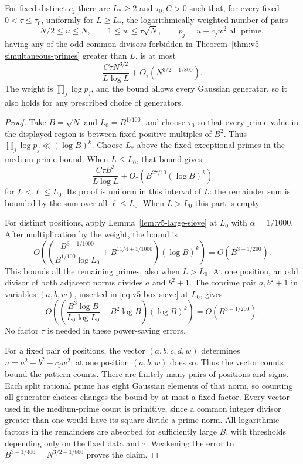 \begin{proposition}\label{prop:v5-obstruction-tail}
For fixed distinct $c_j$ there are $L_*\geq2$ and $\tau_0,C>0$
such that, for every fixed $0<\tau\leq\tau_0$, uniformly for $L\geq L_*$,
the logarithmically weighted number of pairs
\[
 N/2\leq u\leq N,\qquad 1\leq w\leq\tau\sqrt N,
 \qquad p_j=u+c_jw^2\text{ all prime},
\]
having any of the odd common divisors forbidden in
Theorem~\ref{thm:v5-simultaneous-primes} greater than $L$, is at most
\begin{equation}\label{eq:v5-obstruction-tail}
 \frac{C\tau N^{3/2}}{L\log L}
       +O_\tau(N^{3/2-1/800}).
\end{equation}
The weight is $\prod_j\log p_j$, and the bound allows every Gaussian
generator, so it also holds for any prescribed choice of generators.
\end{proposition}
\begin{proof}
Take $B=\sqrt N$ and $L_0=B^{1/100}$, and choose $\tau_0$ so that
every prime value in the displayed region is between fixed positive
multiples of $B^2$. Thus $\prod_j\log p_j\ll (\log B)^k$.
Choose $L_*$ above the fixed exceptional primes in the medium-prime bound.
When $L\leq L_0$, that bound gives
\[
 \frac{C\tau B^3}{L\log L}+O_\tau(B^{27/10}(\log B)^k)
\]
for $L<\ell\leq L_0$. Its proof is uniform in this interval of $L$:
the remainder sum is bounded by the sum over all $\ell\leq L_0$.
When $L>L_0$ this part is empty.

For distinct positions, apply Lemma~\ref{lem:v5-large-sieve} at $L_0$
with $\alpha=1/1000$. After multiplication by the weight, the bound is
\[
 O\left(\left(
   \frac{B^{3+1/1000}}{B^{1/100}\log L_0}
       +B^{11/4+1/1000}\right)(\log B)^k\right)
 =O(B^{3-1/200}).
\]
This bounds all the remaining primes, also when $L>L_0$.
At one position, an odd divisor of both adjacent norms divides
$a$ and $b^2+1$. The coprime pair $a,b^2+1$ in variables $(a,b,w)$,
inserted in \eqref{eq:v5-box-sieve} at $L_0$, gives
\[
 O\left(\left(
 \frac{B^3\log B}{L_0\log L_0}+B^2\log B\right)(\log B)^k\right)
 =O(B^{3-1/200}).
\]
No factor $\tau$ is needed in these power-saving errors.

For a fixed pair of positions, the vector $(a,b,c,d,w)$ determines
$u=a^2+b^2-c_jw^2$; at one position $(a,b,w)$ does so.
Thus the vector counts bound the pattern counts. There are finitely many
pairs of positions and signs. Each split rational prime has eight
Gaussian elements of that norm, so counting all generator choices
changes the bound by at most a fixed factor. Every vector used in the
medium-prime count is primitive, since a common integer divisor greater
than one would have its square divide a prime norm.
All logarithmic factors in the remainders are absorbed for sufficiently
large $B$, with thresholds depending only on the fixed data and $\tau$.
Weakening the error to $B^{3-1/400}=N^{3/2-1/800}$ proves the claim.
\end{proof}

